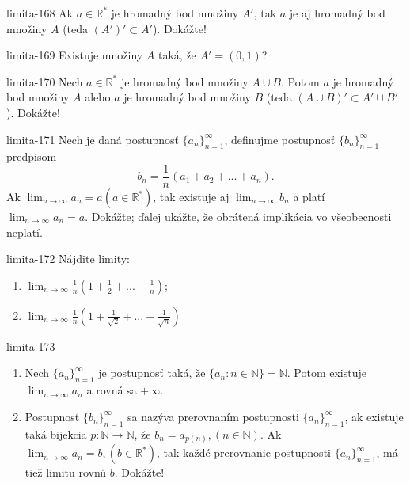 \begin{defproblem}{limita-168}
Ak $a \in \mathbb{R^*}$ je hromadný bod množiny $A'$, tak $a$ je aj hromadný bod množiny $A$ (teda $(A')' \subset A'$). Dokážte!
\end{defproblem}

\begin{defproblem}{limita-169}
Existuje množiny $A$ taká, že $A'=(0,1)$?
\end{defproblem}

\begin{defproblem}{limita-170}
Nech $a \in \mathbb{R^*}$ je hromadný bod množiny $A \cup B$. Potom $a$ je hromadný bod množiny $A$ alebo $a$ je hromadný bod množiny $B$ (teda $(A \cup B)' \subset A' \cup B'$). Dokážte!
\end{defproblem}

\begin{defproblem}{limita-171}
Nech je daná postupnosť ${\{a_n\}}_{n=1}^\infty$, definujme postupnosť ${\{b_n\}}_{n=1}^\infty$ predpisom
$$b_n=\frac{1}{n}(a_1+a_2+...+a_n).$$
Ak $\lim_{n \rightarrow \infty} a_n=a (a \in \mathbb{R^*})$, tak existuje aj $\lim_{n \rightarrow \infty} b_n$ a platí $\lim_{n \rightarrow \infty} a_n=a$. Dokážte; ďalej ukážte, že obrátená implikácia vo všeobecnosti neplatí.
\end{defproblem}

\begin{defproblem}{limita-172}
Nájdite limity:
\begin{enumerate}
\item $\lim_{n \rightarrow \infty} \frac{1}{n}(1+\frac{1}{2}+...+\frac{1}{n})$;
\item $\lim_{n \rightarrow \infty} \frac{1}{n}(1+\frac{1}{\sqrt{2}}+...+\frac{1}{\sqrt{n}})$
\end{enumerate}
\end{defproblem}

\begin{defproblem}{limita-173}
\begin{enumerate}
\item Nech ${\{a_n\}}_{n=1}^\infty$ je postupnosť taká, že $\{ a_n: n \in \mathbb{N} \}=\mathbb{N}$. Potom existuje $\lim_{n \rightarrow \infty} a_n$ a rovná sa $+\infty$.
\item Postupnosť ${\{b_n\}}_{n=1}^\infty$ sa nazýva prerovnaním postupnosti ${\{a_n\}}_{n=1}^\infty$, ak existuje taká bijekcia $p: \mathbb{N} \rightarrow \mathbb{N}$, že $b_n=a_{p(n)},(n \in \mathbb{N})$. Ak $\lim_{n \rightarrow \infty} a_n=b,(b \in \mathbb{R^*})$, tak každé prerovnanie postupnosti ${\{a_n\}}_{n=1}^\infty$, má tiež limitu rovnú $b$. Dokážte!
\end{enumerate}
\end{defproblem}

